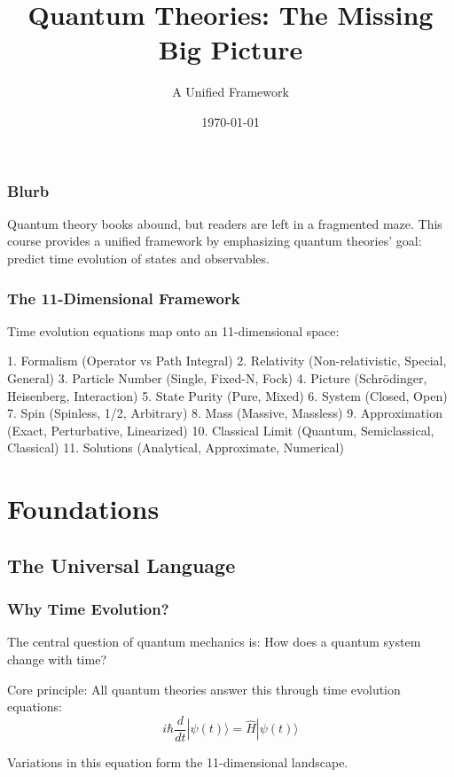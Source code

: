 \documentclass[12pt]{book}
\title{Quantum Theories: The Missing Big Picture}
\author{A Unified Framework}
\date{\today}
\begin{document}
\maketitle

\section*{Blurb}

Quantum theory books abound, but readers are left in a fragmented maze. This course provides a unified framework by emphasizing quantum theories' goal: predict time evolution of states and observables.

\section*{The 11-Dimensional Framework}

Time evolution equations map onto an 11-dimensional space:

1. Formalism (Operator vs Path Integral)
2. Relativity (Non-relativistic, Special, General)
3. Particle Number (Single, Fixed-N, Fock)
4. Picture (Schrödinger, Heisenberg, Interaction)
5. State Purity (Pure, Mixed)
6. System (Closed, Open)
7. Spin (Spinless, 1/2, Arbitrary)
8. Mass (Massive, Massless)
9. Approximation (Exact, Perturbative, Linearized)
10. Classical Limit (Quantum, Semiclassical, Classical)
11. Solutions (Analytical, Approximate, Numerical)

\tableofcontents

\part{Foundations}

\chapter{The Universal Language}

\section{Why Time Evolution?}

The central question of quantum mechanics is: How does a quantum system change with time?

Core principle: All quantum theories answer this through time evolution equations:
$$i\hbar\frac{d}{dt}|\psi(t)\rangle = \hat{H}|\psi(t)\rangle$$

Variations in this equation form the 11-dimensional landscape.
\end{document}
